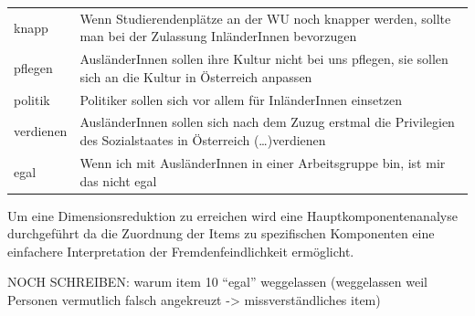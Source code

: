 \documentclass[]{article}
\begin{document}
\begin{longtable}[]{@{}ll@{}}
\begin{minipage}[t]{0.09\columnwidth}\raggedright\strut
knapp\strut
\end{minipage} & \begin{minipage}[t]{0.85\columnwidth}\raggedright\strut
Wenn Studierendenplätze an der WU noch knapper werden, sollte man bei
der Zulassung InländerInnen bevorzugen\strut
\end{minipage}\tabularnewline
\begin{minipage}[t]{0.09\columnwidth}\raggedright\strut
pflegen\strut
\end{minipage} & \begin{minipage}[t]{0.85\columnwidth}\raggedright\strut
AusländerInnen sollen ihre Kultur nicht bei uns pflegen, sie sollen sich
an die Kultur in Österreich anpassen\strut
\end{minipage}\tabularnewline
\begin{minipage}[t]{0.09\columnwidth}\raggedright\strut
politik\strut
\end{minipage} & \begin{minipage}[t]{0.85\columnwidth}\raggedright\strut
Politiker sollen sich vor allem für InländerInnen einsetzen\strut
\end{minipage}\tabularnewline
\begin{minipage}[t]{0.09\columnwidth}\raggedright\strut
verdienen\strut
\end{minipage} & \begin{minipage}[t]{0.85\columnwidth}\raggedright\strut
AusländerInnen sollen sich nach dem Zuzug erstmal die Privilegien des
Sozialstaates in Österreich (\ldots{})verdienen\strut
\end{minipage}\tabularnewline
\begin{minipage}[t]{0.09\columnwidth}\raggedright\strut
egal\strut
\end{minipage} & \begin{minipage}[t]{0.85\columnwidth}\raggedright\strut
Wenn ich mit AusländerInnen in einer Arbeitsgruppe bin, ist mir das
nicht egal\strut
\end{minipage}\tabularnewline
\bottomrule
\end{longtable}

Um eine Dimensionsreduktion zu erreichen wird eine
Hauptkomponentenanalyse durchgeführt da die Zuordnung der Items zu
spezifischen Komponenten eine einfachere Interpretation der
Fremdenfeindlichkeit ermöglicht.

NOCH SCHREIBEN: warum item 10 ``egal'' weggelassen (weggelassen weil
Personen vermutlich falsch angekreuzt -\textgreater{} missverständliches
item)
\end{document}
